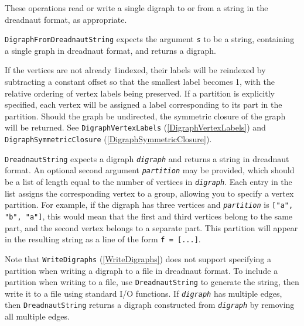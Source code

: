 \documentclass[a4paper,11pt]{report}
\begin{document}
{{{ These operations read or write a single digraph to or from a string in the
dreadnaut format, as appropriate. 

 \texttt{DigraphFromDreadnautString} expects the argument \mbox{\texttt{\mdseries\slshape s}} to be a string, containing a single graph in dreadnaut format, and returns a
digraph.

 If the vertices are not already 1\texttt{}indexed, their labels
will be reindexed by subtracting a constant offset so that the smallest label
becomes 1, with the relative ordering of vertex labels being preserved. If a
partition is explicitly specified, each vertex will be assigned a label
corresponding to its part in the partition. Should the graph be undirected,
the symmetric closure of the graph will be returned. See \texttt{DigraphVertexLabels} (\ref{DigraphVertexLabels}) and \texttt{DigraphSymmetricClosure} (\ref{DigraphSymmetricClosure}).

 \texttt{DreadnautString} expects a digraph \mbox{\texttt{\mdseries\slshape digraph}} and returns a string in dreadnaut format. An optional second argument \mbox{\texttt{\mdseries\slshape partition}} may be provided, which should be a list of length equal to the number of
vertices in \mbox{\texttt{\mdseries\slshape digraph}}. Each entry in the list assigns the corresponding vertex to a group, allowing
you to specify a vertex partition. For example, if the digraph has three
vertices and \mbox{\texttt{\mdseries\slshape partition}} is \texttt{["a", "b", "a"]}, this would mean that the first and third vertices belong to the same part,
and the second vertex belongs to a separate part. This partition will appear
in the resulting string as a line of the form \texttt{f = [...]}.

 Note that \texttt{WriteDigraphs} (\ref{WriteDigraphs}) does not support specifying a partition when writing a digraph to a file in
dreadnaut format. To include a partition when writing to a file, use \texttt{DreadnautString} to generate the string, then write it to a file using standard I/O functions.
If \mbox{\texttt{\mdseries\slshape digraph}} has multiple edges, then \texttt{DreadnautString} returns a digraph constructed from \mbox{\texttt{\mdseries\slshape digraph}} by removing all multiple edges.

}}}
\end{document}
